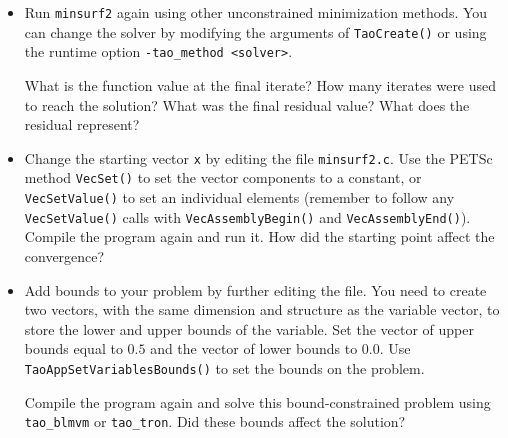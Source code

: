 \documentclass[11pt]{article}
\begin{document}
\begin{enumerate}
\begin{itemize}
  \item
  Run \texttt{minsurf2} again using other unconstrained minimization
  methods.    You can change the solver by modifying the arguments of
  \texttt{TaoCreate()} or using the runtime option \texttt{-tao\_method <solver>}.

  What is the function value at the final iterate?
  How many iterates were used to reach
  the solution?  What was the final residual value? What does the residual represent?

 \item
  Change the starting vector \texttt{x} by editing the file \texttt{minsurf2.c}.
  Use the PETSc method {\tt VecSet()}
  to set the vector components to a constant, or {\tt VecSetValue()} to set
  an individual elements (remember to follow any {\tt VecSetValue()} calls
  with {\tt VecAssemblyBegin()} and {\tt VecAssemblyEnd()}).  Compile the program again and run it.
  How did the starting point affect the convergence?

 \item
  Add bounds to your problem by further editing the file. You need to create two vectors, with the
  same dimension and structure as the variable vector, to store the
  lower and upper bounds of the variable.  Set the vector of upper
  bounds equal to $0.5$ and the vector of lower bounds to $0.0$.  Use
  {\tt TaoAppSetVariablesBounds()} to set the bounds on the problem.

  Compile the program again and solve this bound-constrained problem using  \texttt{tao\_blmvm} or
  \texttt{tao\_tron}. Did these bounds affect the solution?
\end{itemize}

\end{enumerate}
\end{document}
